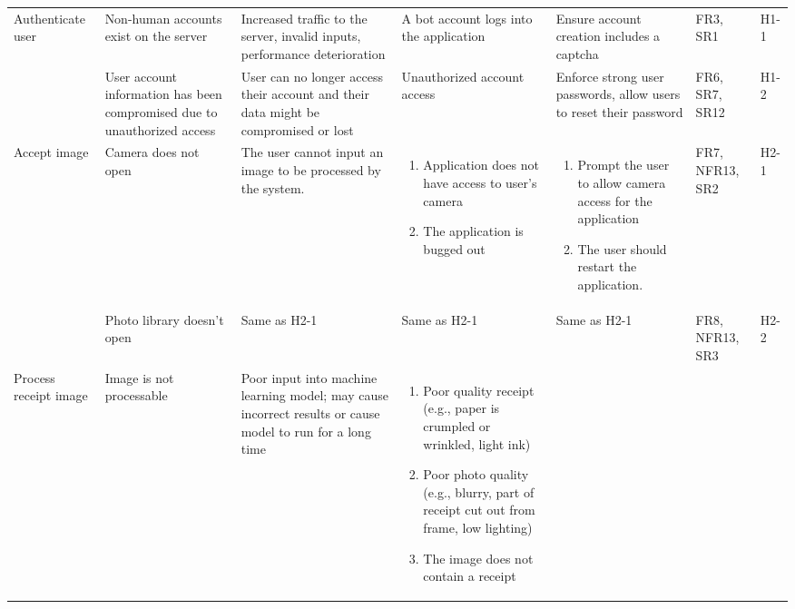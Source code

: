 \documentclass{article}
\begin{document}
\begin{landscape}
\begin{longtable}{|p{3cm}|p{4cm}|p{5cm}|p{5cm}|p{5cm}|p{1cm}|p{0.75cm}|}
    Authenticate user & 
    Non-human accounts exist on the server & 
    Increased traffic to the server, invalid inputs, performance deterioration & 
    A bot account logs into the application & 
    Ensure account creation includes a captcha & 
    FR3, SR1 & 
    H1-1 \\
    \cline{2-7}
     & 
    User account information has been compromised due to unauthorized access & 
    User can no longer access their account and their data might be compromised or lost & 
    Unauthorized account access & 
    Enforce strong user passwords, allow users to reset their password & 
    FR6, SR7, SR12 & 
    H1-2 \\
    \hline
    Accept image & 
    Camera does not open &
    The user cannot input an image to be processed by the system. &
    \begin{enumerate}[label=(\alph*), leftmargin=0.5cm]
        \item Application does not have access to user's camera
        \item The application is bugged out
    \end{enumerate} &
    \begin{enumerate}[label=(\alph*), leftmargin=0.5cm]
        \item Prompt the user to allow camera access for the application
        \item The user should restart the application. 
    \end{enumerate} &
    FR7, NFR13, SR2 &
    H2-1\\
    \cline{2-7}
     & 
    Photo library doesn't open &
    Same as H2-1 &
    Same as H2-1 &
    Same as H2-1 &
    FR8, NFR13, SR3 &
    H2-2\\
    \hline
    Process receipt image &
    Image is not processable &
    Poor input into machine learning model; may cause incorrect results or cause model to run for a long time &
    \begin{enumerate}[label=(\alph*), leftmargin=0.5cm]
        \item Poor quality receipt (e.g., paper is crumpled or wrinkled, light ink) 
        \item Poor photo quality (e.g., blurry, part of receipt cut out from frame, low lighting)
        \item The image does not contain a receipt
    \end{enumerate} &
    \begin{enumerate}[label=(\alph*), leftmargin=0.5cm]

\end{enumerate}
\end{longtable}
\end{landscape}
\end{document}

